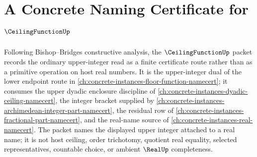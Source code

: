 \chapter{A Concrete Naming Certificate for $\CeilingFunctionUp$}
\label{ch:concrete-instances-ceiling-function-namecert}

Following Bishop--Bridges constructive analysis, the $\CeilingFunctionUp$ packet records the ordinary upper-integer read as a finite certificate route rather than as a primitive operation on host real numbers. It is the upper-integer dual of the lower endpoint route in \autoref{ch:concrete-instances-floor-function-namecert}; it consumes the upper dyadic enclosure discipline of \autoref{ch:concrete-instances-dyadic-ceiling-namecert}, the integer bracket supplied by \autoref{ch:concrete-instances-archimedean-integer-part-namecert}, the residual row of \autoref{ch:concrete-instances-fractional-part-namecert}, and the real-name source of \autoref{ch:concrete-instances-real-namecert}. The packet names the displayed upper integer attached to a real name; it is not host ceiling, order trichotomy, quotient real equality, selected representatives, countable choice, or ambient $\RealUp$ completeness.

